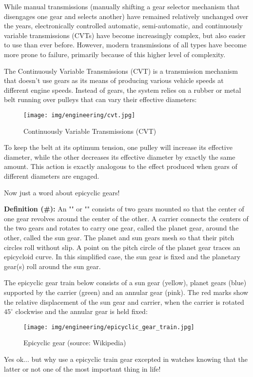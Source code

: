 	While manual transmissions (manually shifting a gear selector mechanism that disengages one gear and selects another) have remained relatively unchanged over the years, electronically controlled automatic, semi-automatic, and continuously variable transmissions (CVTs) have become increasingly complex, but also easier to use than ever before. However, modern transmissions of all types have become more prone to failure, primarily because of this higher level of complexity.
	
	The Continuously Variable Transmissions (CVT) is a transmission mechanism that doesn’t use gears as its means of producing various vehicle speeds at different engine speeds. Instead of gears, the system relies on a rubber or metal belt running over pulleys that can vary their effective diameters:
	\begin{figure}[H]
		\centering
		\texttt{[image: img/engineering/cvt.jpg]}
		\caption{Continuously Variable Transmissions (CVT)}
	\end{figure}
	To keep the belt at its optimum tension, one pulley will increase its effective diameter, while the other decreases its effective diameter by exactly the same amount. This action is exactly analogous to the effect produced when gears of different diameters are engaged.
	
	Now just a word about epicyclic gears\label{epicyclic gears}!
	
	\textbf{Definition (\#\mydef):} An "" or "" consists of two gears mounted so that the center of one gear revolves around the center of the other. A carrier connects the centers of the two gears and rotates to carry one gear, called the planet gear, around the other, called the sun gear. The planet and sun gears mesh so that their pitch circles roll without slip. A point on the pitch circle of the planet gear traces an epicycloid curve. In this simplified case, the sun gear is fixed and the planetary gear(s) roll around the sun gear.
	
	The epicyclic gear train below consists of a sun gear (yellow), planet gears (blue) supported by the carrier (green) and an annular gear (pink). The red marks show the relative displacement of the sun gear and carrier, when the carrier is rotated $45^\circ$ clockwise and the annular gear is held fixed:
	\begin{figure}[H]
		\centering
		\texttt{[image: img/engineering/epicyclic\_gear\_train.jpg]}
		\caption[Epicyclic gear]{Epicyclic gear (source: Wikipedia)}
	\end{figure}
	Yes ok... but why use a epicyclic train gear excepted in watches knowing that the latter or not one of the most important thing in life!
	
